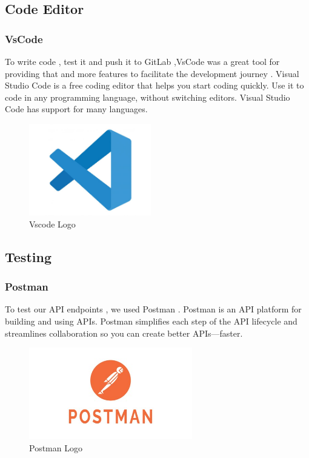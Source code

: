 \subsection{Code Editor}
\subsubsection*{VsCode}
To write code , test it and push it to GitLab ,VsCode was a great tool for providing that and more features to facilitate the development journey .
Visual Studio Code is a free coding editor that helps you start coding quickly. Use it to code in any programming language, without switching editors. Visual Studio Code has support for many languages.\cite{VSCode}
\begin{figure}[H]
    \centering
    \includegraphics[height=4cm]{images/chap1/vscode.jpg}
    \caption{Vscode Logo}
    \label{fig:enter-label}
\end{figure}
\subsection{Testing}
\subsubsection*{Postman}
To test our API endpoints , we used Postman .
Postman is an API platform for building and using APIs. Postman simplifies each step of the API lifecycle and streamlines collaboration so you can create better APIs—faster.\cite{Postman}
\begin{figure}[H]
    \centering
    \includegraphics[height=4cm]{images/chap1/postman.jpg}
    \caption{Postman Logo}
    \label{fig:enter-label}
\end{figure}





